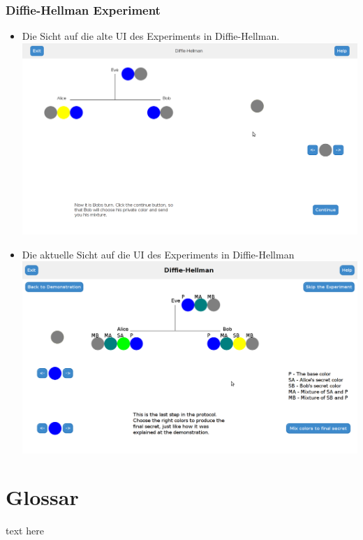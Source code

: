\documentclass{article}
\begin{document}
    \subsubsection{Diffie-Hellman Experiment}
     \begin{itemize}
      \item Die Sicht auf die alte UI des Experiments in Diffie-Hellman.\newline
            \includegraphics[width=15cm]{resources/dhExperiment.png}
      \newpage
      \item Die aktuelle Sicht auf die UI des Experiments in Diffie-Hellman\newline
            \includegraphics[width=15cm]{resources/dhUsabilityFix.png}
     \end{itemize}
    
    
\section{Glossar}
text here

 \restoregeometry

\glsaddall
\printglossary[numberedsection, style=altlist]
\end{document}
